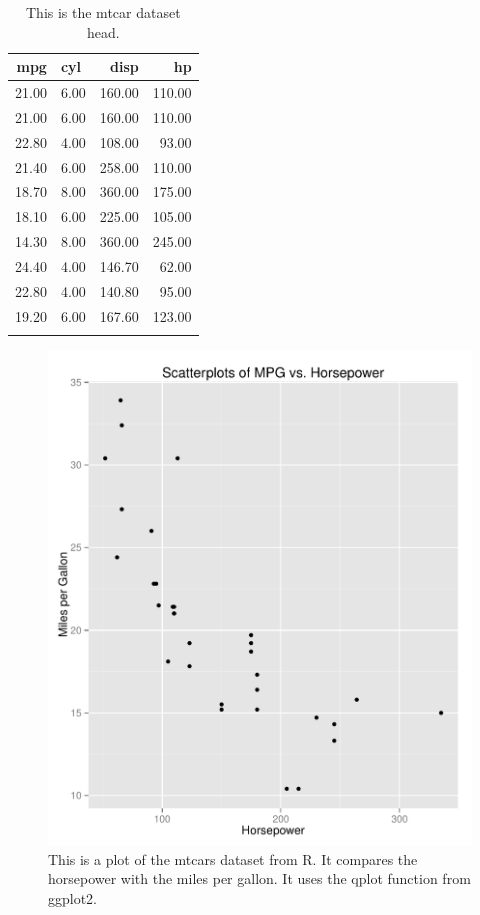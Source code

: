 \documentclass[12pt,english,nohyper]{tufte-handout}\usepackage[]{graphicx}\usepackage[]{color}
\begin{document}
\begin{fullwidth}
\makeatletter\setlength\hsize{\@tufte@fullwidth}\makeatother
\begin{longtable}{r|lr|r}
  \hline
mpg & cyl & disp & hp \\ 
  \hline
21.00 & 6.00 & 160.00 & 110.00 \\ 
  21.00 & 6.00 & 160.00 & 110.00 \\ 
  22.80 & 4.00 & 108.00 & 93.00 \\ 
  21.40 & 6.00 & 258.00 & 110.00 \\ 
  18.70 & 8.00 & 360.00 & 175.00 \\ 
  18.10 & 6.00 & 225.00 & 105.00 \\ 
  14.30 & 8.00 & 360.00 & 245.00 \\ 
  24.40 & 4.00 & 146.70 & 62.00 \\ 
  22.80 & 4.00 & 140.80 & 95.00 \\ 
  19.20 & 6.00 & 167.60 & 123.00 \\ 
   \hline
\hline
\caption{This is the mtcar dataset head.} 
\label{tab:mtcars}
\end{longtable}

\end{fullwidth}



\begin{fullwidth}
\makeatletter\setlength\hsize{\@tufte@fullwidth}\makeatother
\begin{figure}[!ht]
\includegraphics[width=\linewidth]{plot.pdf}
\caption{This is a plot of the mtcars dataset from R. It compares the horsepower with the miles per gallon. It uses the qplot function from ggplot2.}
\label{fig:LearningObj_summary}
\end{figure}
\end{fullwidth}
\end{document}
